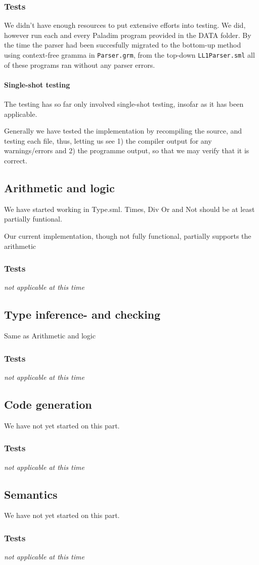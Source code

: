 \documentclass[11pt]{article}
\begin{document}
\subsubsection{Tests}
We didn't have enough resources to put extensive efforts into testing. We did,
however run each and every Paladim program provided in the DATA folder. By the
time the parser had been succesfully migrated to the bottom-up method using
context-free gramma in {\tt Parser.grm}, from the top-down {\tt LL1Parser.sml}
all of these programs ran without any parser errors.

\paragraph{Single-shot testing}
The testing has so far only involved single-shot testing, insofar as it has
been applicable.

Generally we have tested the implementation by recompiling the source, and
testing each file, thus, letting us see 1) the compiler output for any
warnings/errors and 2) the programme output, so that we may verify that it
is correct.

\subsection{Arithmetic and logic}
We have started working in Type.sml. Times, Div Or and Not should be at least partially funtional.

Our current implementation, though not fully functional, partially supports the
arithmetic 

\subsubsection{Tests}
{\it not applicable at this time}%

\subsection{Type inference- and checking}
Same as Arithmetic and logic

\subsubsection{Tests}
{\it not applicable at this time}%

\subsection{Code generation}
We have not yet started on this part.

\subsubsection{Tests}%
{\it not applicable at this time}%

\subsection{Semantics}
We have not yet started on this part.

\subsubsection{Tests}
{\it not applicable at this time}%
\end{document}
